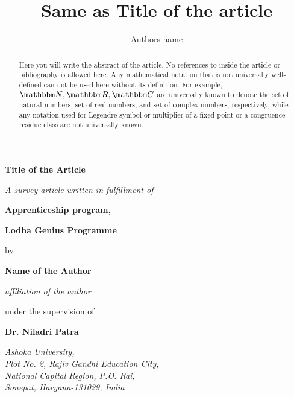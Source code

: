 \documentclass[reqno]{amsart}
\numberwithin{equation}{section}
\theoremstyle{plain}
\theoremstyle{definition}
\theoremstyle{definition}
\newcommand{\R}{{\mathbbm R}}
\newcommand{\C}{{\mathbbm C}}
\newcommand{\N}{{\mathbbm N}}
\begin{document}
\title[Short running title]{ Same as Title of the article}

\author{Authors name}

\address{Author address}  




\begin{titlepage}
   \begin{center}
        
       \Huge     
       \textbf{\color{blue} Title of the Article}
       
       \vspace{0.5cm}
       \LARGE
       \textit{A survey article written in fulfillment of}

        \vspace{0.5cm}
       \LARGE
       \textbf{Apprenticeship program,}


        \huge
        \textbf{Lodha Genius Programme}

        
       \vspace{1.5cm}
       \Large
        by
            
        \huge
       \textbf{\color{blue} Name of the Author}
       
        \LARGE
        \textit{\color{blue} affiliation of the author}
        
       \vspace{1.5cm}

       \Large
       under the supervision of
       
       \huge
       \textbf{Dr. Niladri Patra}

       \LARGE
       \textit{Ashoka University,\\ 
       Plot No. 2, Rajiv Gandhi Education City,\\
       National Capital Region, P.O. Rai,\\
       Sonepat, Haryana-131029, India}
       
            
   \end{center}
\end{titlepage}

\begin{abstract}
    Here you will write the abstract of the article. No references to inside the article or bibliography is allowed here. Any mathematical notation that is not universally well-defined can not be used here without its definition. For example, $\N, \R, \C$ are universally known to denote the set of natural numbers, set of real numbers, and set of complex numbers, respectively, while any notation used for Legendre symbol or multiplier of a fixed point or a congruence residue class are not universally known.  
\end{abstract}
\end{document}
